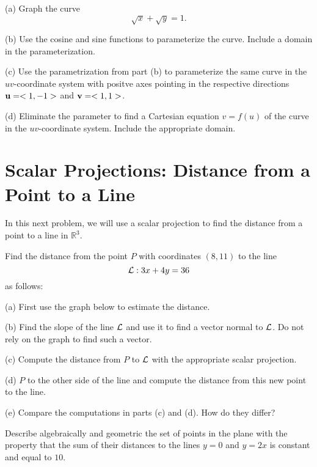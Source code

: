 \documentclass{ximera}
\begin{document}
\begin{question}  \label{Qgvbrh4:Scalar}
(a) Graph the curve
\[
  \sqrt{x} + \sqrt{y} = 1 .
\]

(b) Use the cosine and sine functions to parameterize the curve. Include a domain in the parameterization.

(c) Use the parametrization from part (b) to parameterize the same curve in the $uv$-coordinate system with positve axes pointing in the respective directions ${\bf u} = <1,-1>$ and ${\bf v}= <1,1>$.

(d) Eliminate the parameter to find a Cartesian equation $v=f(u)$ of the curve in the $uv$-coordinate system. Include the appropriate domain.

\end{question}



\section{Scalar Projections: Distance from a Point to a Line}
In this next problem, we will use a scalar projection to find the distance from a point to a line in $\mathbb{R}^3$.


\begin{question}   \label{Qdsfg4nvc:Scalar}
Find the distance from the point $P$ with coordinates $(8,11)$ to the line
\[
   {\cal L}: 3x + 4y = 36
\] 
as follows:

(a) First use the graph below to estimate the distance.

(b) Find the slope of the line ${\cal L}$ and use it to find a vector normal to ${\cal L}$. Do not rely on the graph to find such a vector.

(c) Compute the distance from $P$ to ${\cal L}$ with the appropriate scalar projection.

(d)  $P$ to the other side of the line and compute the distance from this new point to the line. 

(e) Compare the computations in parts (c) and (d). How do they differ?


\begin{exploration}

 
\begin{onlineOnly}
    \begin{center}
\end{center}
\end{onlineOnly}
\end{exploration}
\end{question}


\begin{question}  \label{Qfhghhy:Scalar}
Describe algebraically and geometric the set of points in the plane with the property that the sum of their distances to the lines $y=0$ and $y=2x$ is constant and equal to $10$.
\end{question}
\end{document}
